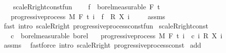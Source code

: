 \begin{isabellebody}
\ \ \isanewline
{}\isamarkupfalse%
\ scaleR{\isacharunderscore}{\kern0pt}right{\isacharunderscore}{\kern0pt}const{\isacharunderscore}{\kern0pt}fun{\isacharcolon}{\kern0pt}\ \isanewline
\ \ \ {\isachardoublequoteopen}f\ {\isasymin}\ borel{\isacharunderscore}{\kern0pt}measurable\ {\isacharparenleft}{\kern0pt}F\ t\ \isanewline
\ \ \ {\isachardoublequoteopen}progressive{\isacharunderscore}{\kern0pt}process\ M\ F\ t\ {\isacharparenleft}{\kern0pt}{\isasymlambda}i\ {\isasymxi}{\isachardot}{\kern0pt}\ f\ {\isasymxi}\ {\isacharasterisk}{\kern0pt}\isactrlsub R\ {\isacharparenleft}{\kern0pt}X\ i\ {\isasymxi}{\isacharparenright}{\kern0pt}{\isacharparenright}{\kern0pt}{\isachardoublequoteclose}\isanewline
%
\isadelimproof
\ \ %
\endisadelimproof
%
\isatagproof
{}\isamarkupfalse%
\ assms\ \isamarkupfalse%
\ {\isacharparenleft}{\kern0pt}fast\ intro{\isacharcolon}{\kern0pt}\ scaleR{\isacharunderscore}{\kern0pt}right\ progressive{\isacharunderscore}{\kern0pt}process{\isacharunderscore}{\kern0pt}const{\isacharunderscore}{\kern0pt}fun{\isacharparenright}{\kern0pt}%
\endisatagproof
{\isafoldproof}%
%
\isadelimproof
\isanewline
%
\endisadelimproof
\isanewline
{}\isamarkupfalse%
\ scaleR{\isacharunderscore}{\kern0pt}right{\isacharunderscore}{\kern0pt}const{\isacharcolon}{\kern0pt}\ \isanewline
\ \ \ {\isachardoublequoteopen}c\ {\isasymin}\ borel{\isacharunderscore}{\kern0pt}measurable\ borel{\isachardoublequoteclose}\isanewline
\ \ \ {\isachardoublequoteopen}progressive{\isacharunderscore}{\kern0pt}process\ M\ F\ t\ {\isacharparenleft}{\kern0pt}{\isasymlambda}i\ {\isasymxi}{\isachardot}{\kern0pt}\ c\ i\ {\isacharasterisk}{\kern0pt}\isactrlsub R\ {\isacharparenleft}{\kern0pt}X\ i\ {\isasymxi}{\isacharparenright}{\kern0pt}{\isacharparenright}{\kern0pt}{\isachardoublequoteclose}\ \isanewline
%
\isadelimproof
\ \ %
\endisadelimproof
%
\isatagproof
{}\isamarkupfalse%
\ assms\ \isamarkupfalse%
\ {\isacharparenleft}{\kern0pt}fastforce\ intro{\isacharcolon}{\kern0pt}\ scaleR{\isacharunderscore}{\kern0pt}right\ progressive{\isacharunderscore}{\kern0pt}process{\isacharunderscore}{\kern0pt}const{\isacharparenright}{\kern0pt}%
\endisatagproof
{\isafoldproof}%
%
\isadelimproof
\isanewline
%
\endisadelimproof
\isanewline
{}\isamarkupfalse%
\ add{\isacharcolon}{\kern0pt}\isanewline

\end{isabellebody}
